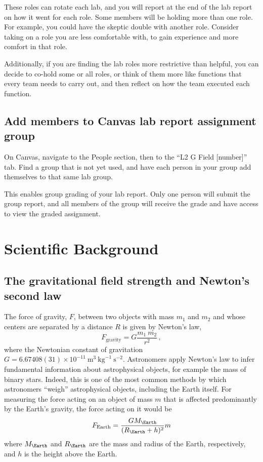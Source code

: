 These roles can rotate each lab, and you will report at the end of the lab report on how it went for each role. Some members will be holding more than one role. For example, you could have the skeptic double with another role. Consider taking on a role you are less comfortable with, to gain experience and more comfort in that role.

Additionally, if you are finding the lab roles more restrictive than helpful, you can decide to co-hold some or all roles, or think of them more like functions that every team needs to carry out, and then reflect on how the team executed each function.

\subsection{Add members to Canvas lab report assignment group}

\begin{steps}
	\item On Canvas, navigate to the People section, then to the ``L2 G Field [number]'' tab. Find a group that is not yet used, and have each person in your group add themselves to that same lab group.
\end{steps}

This enables group grading of your lab report. Only one person will submit the group report, and all members of the group will receive the grade and have access to view the graded assignment.

\section{Scientific Background}

\subsection{The gravitational field strength and Newton's second law}

The force of gravity, $F$, between two objects with mass $m_1$ and $m_2$ and whose centers are separated by a distance $R$ is given by Newton's law,
\begin{equation}\label{lg:eq:newtons}
 F_\textrm{gravity} = G \frac{m_1 \: m_2}{r^2} \,,
\end{equation}
where the Newtonian constant of gravitation $G = 6.67408(31) \times 10^{-11} \: \textrm{m}^3 \: \textrm{kg}^{-1} \: \textrm{s}^{-2}$. Astronomers apply Newton's law to infer fundamental information about astrophysical objects, for example the mass of binary stars. Indeed, this is one of the most common methods by which astronomers ``weigh'' astrophysical objects, including the Earth itself. For measuring the force acting on an object of mass $m$ that is affected predominantly by the Earth's gravity, the force acting on it would be
\begin{equation}\label{lg:eq:fearth}
 F_\textrm{Earth} = \frac{G M_\Earth}{(R_\Earth + h)^2} m
\end{equation}
where $M_\Earth$ and $R_\Earth$ are the mass and radius of the Earth, respectively, and $h$ is the height above the Earth.

